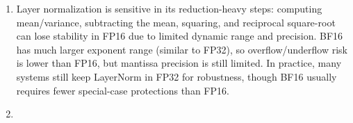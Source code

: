 \documentclass{article}
\begin{document}
\begin{enumerate}[start=1,label=\arabic*.]
\begin{enumerate}
\begin{itemize}
\begin{enumerate}[label=\alph*.]
\begin{itemize}
                                \item the model's predicted logits: \textbf{float16}
                                \item the loss: \textbf{float32} (loss is kept in higher precision for stability)
                                \item the model's gradients: \textbf{float32} (gradients are kept in higher precision for stability)
                            \end{itemize}
                        \item Layer normalization is sensitive in its reduction-heavy steps: computing mean/variance, subtracting the mean, squaring, and reciprocal square-root can lose stability in FP16 due to limited dynamic range and precision. BF16 has much larger exponent range (similar to FP32), so overflow/underflow risk is lower than FP16, but mantissa precision is still limited. In practice, many systems still keep LayerNorm in FP32 for robustness, though BF16 usually requires fewer special-case protections than FP16.
                        \item 

\end{enumerate}
\end{itemize}
\end{enumerate}
\end{enumerate}
\end{document}
